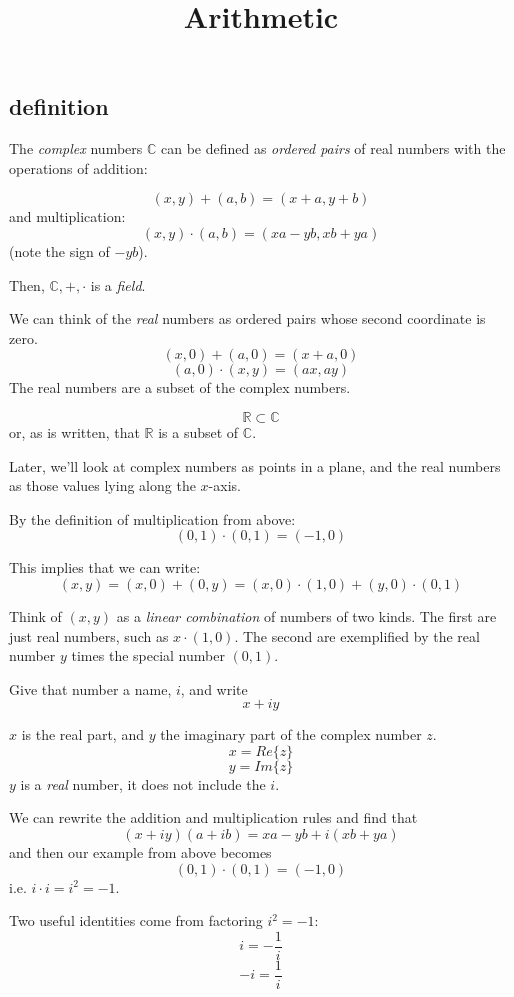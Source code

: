 \documentclass[11pt, oneside]{article}
\title{Arithmetic}
\date{}
\begin{document}
\maketitle
\Large


\subsection*{definition}

The \emph{complex} numbers $\mathbb{C}$ can be defined as \emph{ordered pairs} of real numbers with the operations of addition:

\[ (x,y) + (a,b) = (x + a, y + b) \]
and multiplication:
\[ (x,y) \cdot (a,b) = (xa - yb, xb + ya) \]
(note the sign of $-yb$).

Then, $\mathbb{C}, +, \cdot$ is a \emph{field}.

We can think of the \emph{real} numbers as ordered pairs whose second coordinate is zero.
\[ (x,0) + (a,0) = (x + a, 0) \]
\[ (a,0) \cdot (x,y) = (ax,ay) \]
The real numbers are a subset of the complex numbers.

\[ \mathbb{R} \subset \mathbb{C} \]
or, as is written, that $\mathbb{R}$ is a subset of $\mathbb{C}$.

Later, we'll look at complex numbers as points in a plane, and the real numbers as those values lying along the $x$-axis.

By the definition of multiplication from above:
\[ (0,1) \cdot (0,1) = (-1,0) \]

This implies that we can write:
\[ (x,y) = (x,0) + (0,y) = (x,0) \cdot (1,0) + (y,0) \cdot (0,1) \]

Think of $(x,y)$ as a \emph{linear combination} of numbers of two kinds.  The first are just real numbers, such as $x \cdot (1,0)$.  The second are exemplified by the real number $y$ times the special number $(0,1)$.  

Give that number a name, $i$, and write
\[ x + iy \]

$x$ is the real part, and $y$ the imaginary part of the complex number $z$.
\[ x = Re \{z\} \]
\[ y = Im \{z\} \]
$y$ is a \emph{real} number, it does not include the $i$.

We can rewrite the addition and multiplication rules and find that
\[ (x + iy)(a + ib) = xa - yb + i(xb + ya) \]
and then our example from above becomes
\[ (0,1) \cdot (0,1) = (-1,0) \]
i.e. $i \cdot i = i^2 = -1$.

Two useful identities come from factoring $i^2 = -1$:
\[ i = -\frac{1}{i}  \]
\[ -i = \frac{1}{i} \]
\end{document}
